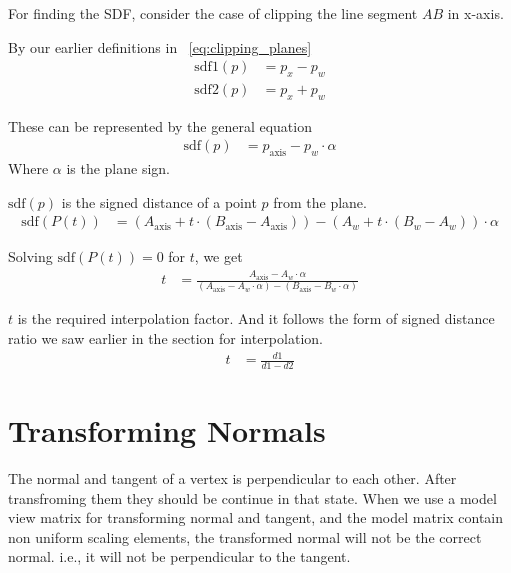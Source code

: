 For finding the SDF, consider the case of clipping the line segment $AB$ in x-axis.

By our earlier definitions in ~\eqref{eq:clipping_planes}
\begin{align*}
\text{sdf1}(p) &= p_x - p_w \\
\text{sdf2}(p) &= p_x + p_w
\end{align*}

These can be represented by the general equation
\begin{align}
\text{sdf}(p) &= p_{\text{axis}} - p_w \cdot \alpha
\end{align}
Where $\alpha$ is the plane sign. 

$\text{sdf}(p)$ is the signed distance of a point $p$ from the plane.
\begin{align*}
\text{sdf}(P(t)) &= (A_{\text{axis}} + t \cdot (B_{\text{axis}} - A_{\text{axis}})) 
              - (A_w + t \cdot (B_w - A_w)) \cdot \alpha
\end{align*}


Solving $\text{sdf}(P(t)) = 0$ for $t$, we get
\begin{align}
t &= \frac{A_{\text{axis}} - A_w \cdot \alpha}{(A_{\text{axis}} - A_w \cdot \alpha) - (B_{\text{axis}} - B_w \cdot \alpha)}
\end{align}

$t$ is the required interpolation factor.
And it follows the form of signed distance ratio we saw earlier in the section for interpolation.
\begin{align*}
t &=  \frac{d1}{d1-d2} 
\end{align*}


\section{Transforming Normals}
The normal and tangent of a vertex is perpendicular to each other. After transfroming them they should be continue in that state. When we use a model view matrix for transforming normal and tangent, and the model matrix contain non uniform scaling elements, the transformed normal will not be the correct normal. i.e., it will not be perpendicular to the tangent. 

